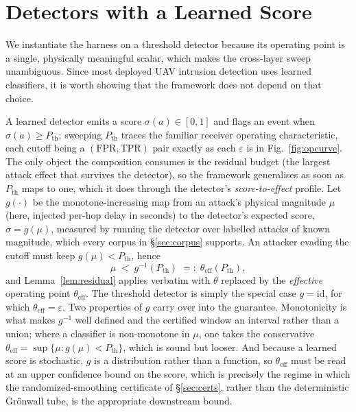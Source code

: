 \section{Detectors with a Learned Score}
\label{app:learned}
\label{sec:roc}
We instantiate the harness on a threshold detector because its operating point
is a single, physically meaningful scalar, which makes the cross-layer sweep
unambiguous. Since most deployed UAV intrusion detection uses learned
classifiers, it is worth showing that the framework does not depend on that
choice.

A learned detector emits a score $\sigma(a)\in[0,1]$ and flags an event when
$\sigma(a)\ge P_{\mathrm{th}}$; sweeping $P_{\mathrm{th}}$ traces the familiar
receiver operating characteristic, each cutoff being a
$(\mathrm{FPR},\mathrm{TPR})$ pair exactly as each $\varepsilon$ is in
Fig.~\ref{fig:opcurve}. The only object the composition consumes is the residual
budget (the largest attack effect that survives the detector), so the framework
generalises as soon as $P_{\mathrm{th}}$ maps to one, which it does through the
detector's \emph{score-to-effect} profile. Let $g(\cdot)$ be the
monotone-increasing map from an attack's physical magnitude $\mu$ (here,
injected per-hop delay in seconds) to the detector's expected score,
$\sigma=g(\mu)$, measured by running the detector over labelled attacks of known
magnitude, which every corpus in \S\ref{sec:corpus} supports. An attacker
evading the cutoff must keep $g(\mu)<P_{\mathrm{th}}$, hence
\begin{equation}
\label{eq:pth}
\mu \;<\; g^{-1}(P_{\mathrm{th}}) \;=:\; \theta_{\mathrm{eff}}(P_{\mathrm{th}}),
\end{equation}
and Lemma~\ref{lem:residual} applies verbatim with $\theta$ replaced by the
\emph{effective} operating point $\theta_{\mathrm{eff}}$. The threshold detector
is simply the special case $g=\mathrm{id}$, for which
$\theta_{\mathrm{eff}}=\varepsilon$. Two properties of $g$ carry over into the
guarantee. Monotonicity is what makes $g^{-1}$ well defined and the certified
window an interval rather than a union; where a classifier is non-monotone in
$\mu$, one takes the conservative
$\theta_{\mathrm{eff}}=\sup\{\mu: g(\mu)<P_{\mathrm{th}}\}$, which is sound but
looser. And because a learned score is stochastic, $g$ is a distribution rather
than a function, so $\theta_{\mathrm{eff}}$ must be read at an upper confidence
bound on the score, which is precisely the regime in which the
randomized-smoothing certificate of \S\ref{sec:certs}, rather than the
deterministic Gr\"onwall tube, is the appropriate downstream bound.

